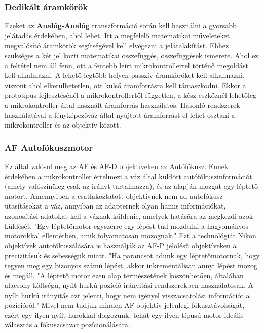 \subsubsection{Dedikált áramkörök}
Ezeket az \textbf{Analóg-Analóg} transzformáció során kell használni a gyorsabb jelátadás érdekében, ahol lehet. Itt a megfelelő matematikai műveleteket megvalósító áramkörök segítségével kell elvégezni a jelátalakítást. Ehhez szükséges a két jel közti matematikai összefüggés, összefüggések ismerete. Ahol ez a feltétel nem áll fenn, ott a fentebb leírt mikrokontrollerrel történő megoldást kell alkalmazni. A lehető legtöbb helyen passzív áramköröket kell alkalmazni, viszont ahol elkerülhetetlen, ott külső áramforrásra kell támaszkodni. Ekkor a prototípus fejlesztésénél a mikrokontrollertől független, a kész eszköznél lehetőleg a mikrokontroller által használt áramforrás használatos. Hasonló rendszerek használatával a fényképezőváz által nyújtott áramforrást el lehet osztani a mikrokontroller és az objektív között.

\subsubsection{AF Autofókuszmotor}
Ez által valósul meg az AF és AF-D objektíveken az Autófókusz. Ennek érdekében a mikrokontroller értelmezi a váz által küldött autófókuszinformációt (amely valószínüleg csak az irányt tartalmazza), és az alapján mozgat egy léptető motort. Amennyiben a csatlakoztatott objektívnek nem ad autofókusz utasításokat a váz, annyiban az adapternek olyan hamis információkat, azonosítási adatokat kell a váznak küldenie, amelyek hatására az megkezdi azok küldését. "Egy léptetőmotor egyszerre egy lépést tud mozdulni a hagyományos motorokkal ellentétben, amik folyamatosan mozognak."\cite{parmar2017design} Ezt a technológiát Nikon objektívek autofókuszálására is használják az AF-P jelölésű objektíveken \cite{Nikon_AF} a precizitásuk és sebességük miatt. "Ha parancsot adunk egy léptetőmotornak, hogy tegyen meg egy bizonyos számú lépést, akkor inkrementálisan annyi lépést mozog és megáll. "A léptető motor ezen alap természetének köszönhetően, általában alacsony költségű, nyílt hurkú pozíció irányitási rendszerekben használatosak. A nyílt hurkú irányítás azt jelenti, hogy nem igényel visszacsatolási információt a pozícióról." \cite{parmar2017design} Mivel nem tudjuk minden AF objektív jelenlegi fókusztávolságát\cite{Nikon_AF}, ezért egy ilyen nyílt hurokkal dolgozunk, tehát egy ilyen típusú motor ideális választás a fókuszcsavar pozícionálására. %

